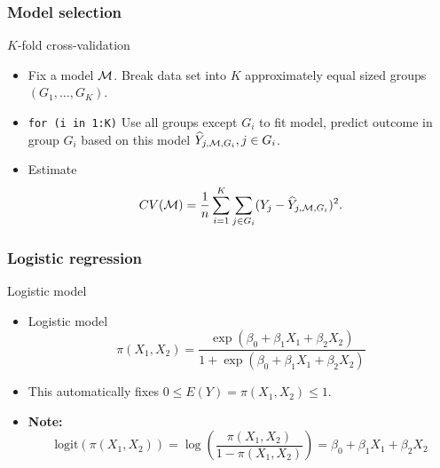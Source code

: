 \documentclass[handout]{beamer}
\begin{document}

   \begin{frame} \frametitle{Model selection}

   \begin{block}
   {$K$-fold cross-validation                     }
       \begin{itemize}

       \item Fix a model ${\cal M}$.
       Break data set into $K$ approximately equal sized groups $(G_1, \dots, G_K)$.

       \item {\tt for (i in 1:K)} Use all groups
       except $G_i$ to fit model, predict  outcome in group $G_i$ based on this model $\widehat{Y}_{j,{\cal M}, G_i}, j \in G_i$.

       \item Estimate
   $$
   CV({\cal M}) = \frac{1}{n}\sum_{i=1}^K \sum_{j \in G_i} (Y_j - \widehat{Y}_{j,{\cal M},G_i})^2.$$
       \end{itemize}

   \end{block}
   \end{frame}


   \begin{frame} \frametitle{Logistic regression}

   \begin{block}
       {Logistic model}
       \begin{itemize}
       \item Logistic model
   $$
   \pi(X_1,X_2) = \frac{\exp(\beta_0 + \beta_1 X_1 + \beta_2 X_2)}{1 + \exp(\beta_0 + \beta_1 X_1 + \beta_2 X_2)}
   $$

   \item This automatically fixes $0 \leq E(Y) = \pi(X_1,X_2) \leq 1$.


   \item {\bf Note:}
   $$
   \text{logit}(\pi(X_1, X_2)) = \log\left(\frac{\pi(X_1, X_2)}{1 - \pi(X_1,X_2)}\right) = \beta_0 + \beta_1 X_1 + \beta_2 X_2
   $$

       \end{itemize}
   \end{block}
   \end{frame}

\end{document}
